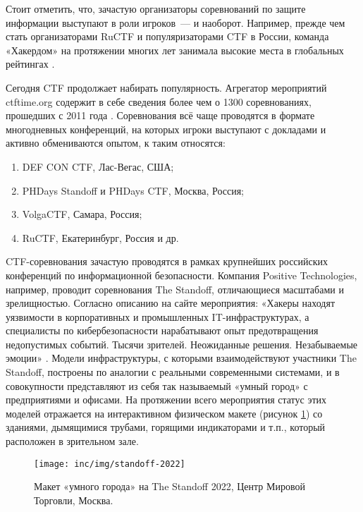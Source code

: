 Стоит отметить, что, зачастую организаторы соревнований по защите информации выступают в роли игроков~--- и наоборот. Например, прежде чем стать организаторами RuCTF и популяризаторами CTF в России, команда «Хакердом» на протяжении многих лет занимала высокие места в глобальных рейтингах \cite{HackerdomRating}.

Сегодня CTF продолжает набирать популярность. Агрегатор мероприятий ctftime.org содержит в себе сведения более чем о 1300 соревнованиях, прошедших с 2011 года \cite{CTFTimeTotal}. Соревнования всё чаще проводятся в формате многодневных конференций, на которых игроки выступают с докладами и активно обмениваются опытом, к таким относятся:
\begin{enumerate}
  \item DEF CON CTF, Лас-Вегас, США;
  \item PHDays Standoff и PHDays CTF, Москва, Россия;
  \item VolgaCTF, Самара, Россия;
  \item RuCTF, Екатеринбург, Россия и др.
\end{enumerate}

CTF-соревнования зачастую проводятся в рамках крупнейших российских конференций по информационной безопасности. Компания Positive Technologies, например, проводит соревнования The Standoff, отличающиеся масштабами и зрелищностью. Согласно описанию на сайте мероприятия: «Хакеры находят уязвимости в корпоративных и промышленных IT-инфраструктурах, а специалисты по кибербезопасности нарабатывают опыт предотвращения недопустимых событий. Тысячи зрителей. Неожиданные решения. Незабываемые эмоции» \cite{TheStandoff}. Модели инфраструктуры, с которыми взаимодействуют участники The Standoff, построены по аналогии с реальными современными системами, и в совокупности представляют из себя так называемый «умный город» с предприятиями и офисами. На протяжении всего мероприятия статус этих моделей отражается на интерактивном физическом макете (рисунок \ref{fig:standoff-2022}) со зданиями, дымящимися трубами, горящими индикаторами и т.п., который расположен в зрительном зале.

\begin{figure}[h]
  \centering
  \texttt{[image: inc/img/standoff-2022]}
  \caption{Макет «умного города» на The Standoff 2022, Центр Мировой Торговли, Москва.}
  \label{fig:standoff-2022}
\end{figure}

